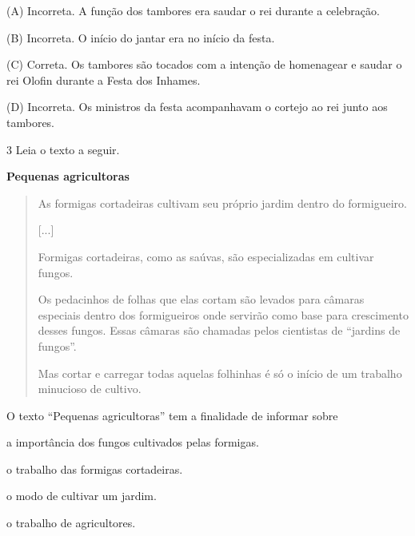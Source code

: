 
(A) Incorreta. A função dos tambores era saudar o rei durante a
celebração.

(B) Incorreta. O início do jantar era no início da festa.

(C) Correta. Os tambores são tocados com a intenção de homenagear e
saudar o rei Olofin durante a Festa dos Inhames.

(D) Incorreta. Os ministros da festa acompanhavam o cortejo ao rei junto
aos tambores.

\num{3} Leia o texto a seguir. %

\textbf{Pequenas agricultoras}

\begin{quote}
As formigas cortadeiras cultivam seu próprio jardim dentro do
formigueiro.

{[}...{]}

Formigas cortadeiras, como as saúvas, são especializadas em cultivar
fungos.

Os pedacinhos de folhas que elas cortam são levados para câmaras
especiais dentro dos formigueiros onde servirão como base para crescimento desses
fungos. Essas câmaras são chamadas pelos cientistas de ``jardins de
fungos''.

Mas cortar e carregar todas aquelas folhinhas é só o início de um
trabalho minucioso de cultivo.

\end{quote}

O texto ``Pequenas agricultoras'' tem a finalidade de informar sobre

\begin{escolha}
\item a importância dos fungos cultivados pelas formigas.

\item o trabalho das formigas cortadeiras.

\item o modo de cultivar um jardim.

\item o trabalho de agricultores.
\end{escolha}


